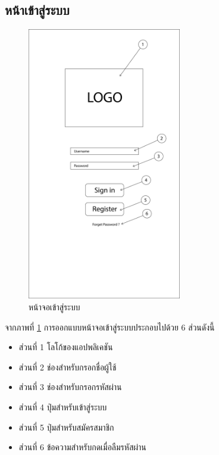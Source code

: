 	\subsection{หน้าเข้าสู่ระบบ}
		\begin{figure}[H]
			\centering
			\includegraphics[width=0.6\textwidth]{Figures/3/UI/login}
			\caption{หน้าจอเข้าสู่ระบบ}
			\label{Fig:หน้าจอเข้าสู่ระบบ}
		\end{figure}
		จากภาพที่ \ref{Fig:หน้าจอเข้าสู่ระบบ} การออกแบบหน้าจอเข้าสู่ระบบประกอบไปด้วย 6 ส่วนดังนี้
		\begin{itemize}
			\item ส่วนที่ 1 โลโก้ของแอปพลิเคชัน
			\item ส่วนที่ 2 ช่องสำหรับกรอกชื่อผู้ใช้
			\item ส่วนที่ 3 ช่องสำหรับกรอกรหัสผ่าน
			\item ส่วนที่ 4 ปุ่มสำหรับเข้าสู่ระบบ
			\item ส่วนที่ 5 ปุ่มสำหรับสมัครสมาชิก
			\item ส่วนที่ 6 ข้อความสำหรับกดเมื่อลืมรหัสผ่าน
		\end{itemize}

